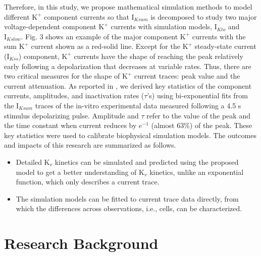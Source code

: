 \documentclass[journal]{IEEEtran}
\begin{document}
Therefore, in this study, we propose mathematical simulation methods to model different $\text{K}^{+}$ component currents so that $\text{I}_{Ksum}$ is decomposed to study two major voltage-dependent component $\text{K}^{+}$ currents with simulation models, $\text{I}_{Kto}$ and $\text{I}_{Kslow}$. Fig. 3 shows an example of the major component $\text{K}^{+}$ currents with the sum $\text{K}^{+}$ current shown as a red-solid line. Except for the $\text{K}^{+}$ steady-state current ($\text{I}_{Kss}$) component, $\text{K}^{+}$ currents have the shape of reaching the peak relatively early following a depolarization that decreases at variable rates. Thus, there are two critical measures for the shape of $\text{K}^{+}$ current traces: peak value and the current attenuation. As reported in \cite{ednie2019reduced}, we derived key statistics of the component currents, amplitudes, and inactivation rates ($\tau$'s) using bi-exponential fits from the $\text{I}_{Ksum}$ traces of the in-vitro experimental data measured following a 4.5 s stimulus depolarizing pulse. Amplitude and $\tau$ refer to the value of the peak and the time constant when current reduces by $e^{-1}$ (almost 63\%) of the peak. These key statistics were used to calibrate biophysical simulation models. The outcomes and impacts of this research are summarized as follows.
\begin{itemize}
    \item Detailed $\text{K}_{v}$ kinetics can be simulated and predicted using the proposed model to get a better understanding of $\text{K}_{v}$ kinetics, unlike an exponential function, which only describes a current trace.
    \item The simulation models can be fitted to current trace data directly, from which the differences across observations, i.e., cells, can be characterized.
\end{itemize}

\section{Research Background}
\end{document}
